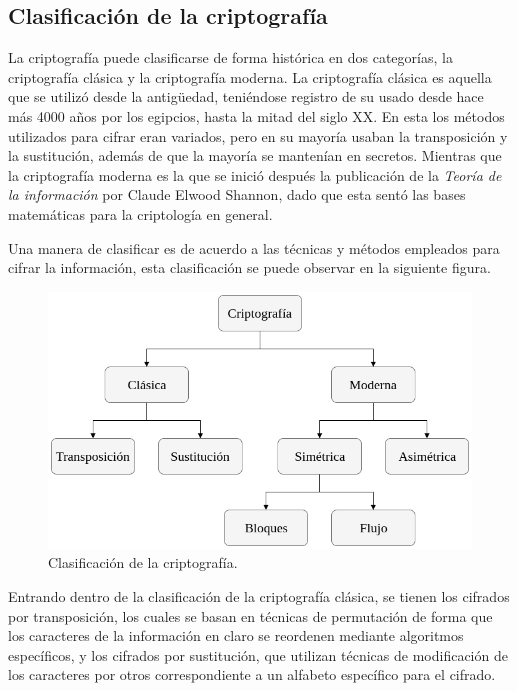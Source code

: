   \subsection{Clasificación de la criptografía}
  
    La criptografía puede clasificarse de forma histórica en dos categorías, 
    la criptografía clásica y la criptografía moderna. La criptografía clásica 
    es aquella que se utilizó desde la antigüedad, teniéndose registro de su 
    usado desde hace más 4000 años por los egipcios, hasta la mitad del siglo 
    XX. En esta los métodos utilizados para cifrar eran variados, pero en su 
    mayoría usaban la transposición y la sustitución, además de que la mayoría 
    se mantenían en secretos. Mientras que la criptografía moderna es la que 
    se inició después la publicación de la \textit{Teoría de la información} 
    por Claude Elwood Shannon, dado que esta sentó las bases matemáticas para 
    la criptología en general.
 
    Una manera de clasificar es de acuerdo a las técnicas y métodos empleados 
    para cifrar la información, esta clasificación se puede observar en la 
    siguiente figura.
  
    \begin{figure}[H]
      \begin{center}
        \includegraphics[width=0.7\linewidth]
          {contenidos/antecedentes/intro_img/clasificacion_cripto.png}
        \caption{Clasificación de la criptografía.}
      \end{center}
    \end{figure}
  
    Entrando dentro de la clasificación de la criptografía clásica, se tienen 
    los cifrados por transposición, los cuales se basan en técnicas de 
    permutación de forma que los caracteres de la información en claro se 
    reordenen mediante algoritmos específicos, y los cifrados por sustitución, 
    que utilizan técnicas de modificación de los caracteres por otros 
    correspondiente a un alfabeto específico para el cifrado. 
  

